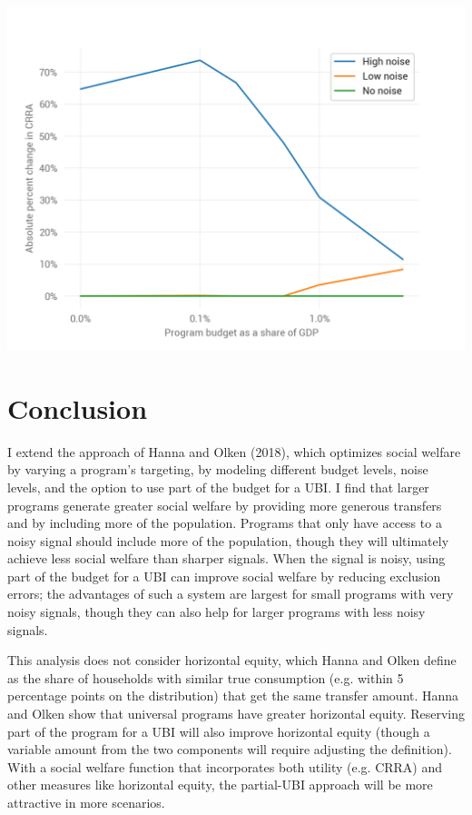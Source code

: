 \documentclass[12pt]{article}
\begin{document}
\begin{center}
	\includegraphics{improvement_from_partial_ubi}  %
	\label{fig:improvement_from_partial_ubi}
\end{center}

\section{Conclusion} \label{sec:conclusion}

I extend the approach of Hanna and Olken (2018), which optimizes social welfare 
by varying a program's targeting, by modeling different budget levels, noise 
levels, and the option to use part of the budget for a UBI.
I find that larger  programs generate greater social welfare by providing more 
generous transfers and by including more of the population.
Programs that only have access to a noisy signal should include more of the 
population,
though they will ultimately achieve less social welfare than sharper signals.
When the signal is noisy,
using part of the budget for a UBI can improve social welfare by
reducing exclusion errors;
the advantages of such a system are largest for small programs with
very noisy signals,
though they can also help for larger programs with less noisy signals.

This analysis does not consider horizontal equity, which Hanna and Olken define 
as the share of households with similar true consumption (e.g. within 5 
percentage points on the distribution) that get the same transfer amount. Hanna 
and Olken show that universal programs have greater horizontal equity. 
Reserving part of the program for a UBI will also improve horizontal equity 
(though a variable amount from the two components will require adjusting the 
definition). With a social welfare function that incorporates both utility 
(e.g. CRRA) and other measures like horizontal equity, the partial-UBI approach 
will be more attractive in more scenarios.



\clearpage


\end{document}
